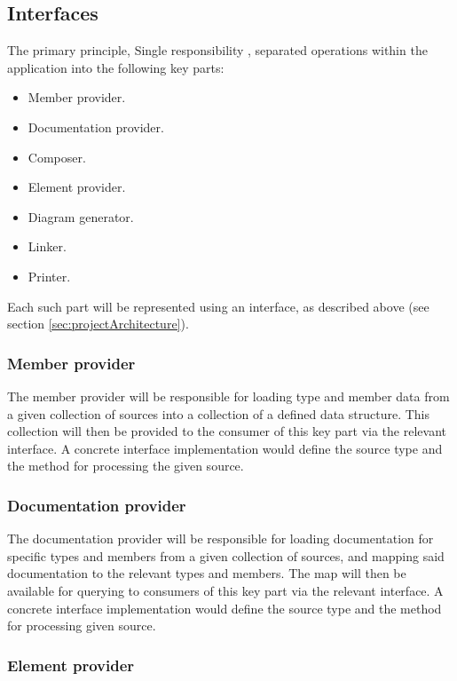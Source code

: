 \subsection{Interfaces} \label{sec:projectComponents}

The primary principle, Single responsibility \cite{hall_adaptive_2017}, separated operations within the application into the following key parts:
\begin{itemize}
    \item Member provider.
    \item Documentation provider.
    \item Composer.
    \item Element provider.
    \item Diagram generator.
    \item Linker.
    \item Printer.
\end{itemize}

Each such part will be represented using an interface, as described above (see section \ref{sec:projectArchitecture}).

\subsubsection{Member provider}

The member provider will be responsible for loading type and member data from a given collection of sources into a collection of a defined data structure.
This collection will then be provided to the consumer of this key part via the relevant interface.
A concrete interface implementation would define the source type and the method for processing the given source.

\subsubsection{Documentation provider}

The documentation provider will be responsible for loading documentation for specific types and members from a given collection of sources, and mapping said documentation to the relevant types and members.
The map will then be available for querying to consumers of this key part via the relevant interface.
A concrete interface implementation would define the source type and the method for processing given source.

\subsubsection{Element provider} \label{sec:elementProvider}

